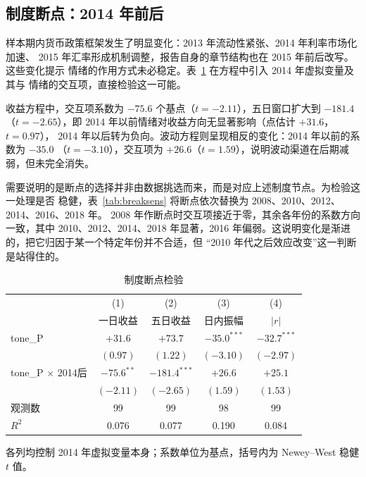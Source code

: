 \subsection{制度断点：2014 年前后}

样本期内货币政策框架发生了明显变化：2013 年流动性紧张、2014 年利率市场化加速、
2015 年汇率形成机制调整，报告自身的章节结构也在 2015 年前后改写。这些变化提示
情绪的作用方式未必稳定。表~\ref{tab:break} 在方程中引入 2014 年虚拟变量及其与
情绪的交互项，直接检验这一可能。

收益方程中，交互项系数为 $-75.6$ 个基点（$t=-2.11$），五日窗口扩大到 $-181.4$
（$t=-2.65$），即 2014 年以前情绪对收益方向无显著影响（点估计 $+31.6$，$t=0.97$），
2014 年以后转为负向。波动方程则呈现相反的变化：2014 年以前的系数为 $-35.0$
（$t=-3.10$），交互项为 $+26.6$（$t=1.59$），说明波动渠道在后期减弱，但未完全消失。

需要说明的是断点的选择并非由数据挑选而来，而是对应上述制度节点。为检验这一处理是否
稳健，表~\ref{tab:breaksens} 将断点依次替换为 2008、2010、2012、2014、2016、2018 年。
2008 年作断点时交互项接近于零，其余各年份的系数方向一致，其中 2010、2012、2014、2018
年显著，2016 年偏弱。这说明变化是渐进的，把它归因于某一个特定年份并不合适，但
``2010 年代之后效应改变''这一判断是站得住的。

\begin{table}[htbp]
\centering
\small
\begin{threeparttable}
\caption{制度断点检验}
\label{tab:break}
\begin{tabular}{lcccc}
\toprule
 & (1) & (2) & (3) & (4) \\
 & 一日收益 & 五日收益 & 日内振幅 & $|r|$ \\
\midrule
tone\_P              & $+31.6$   & $+73.7$   & $-35.0^{***}$ & $-32.7^{***}$ \\
                      & $(0.97)$  & $(1.22)$  & $(-3.10)$     & $(-2.97)$ \\
tone\_P $\times$ 2014后 & $-75.6^{**}$ & $-181.4^{***}$ & $+26.6$ & $+25.1$ \\
                      & $(-2.11)$ & $(-2.65)$ & $(1.59)$      & $(1.53)$ \\
\midrule
观测数                & 99 & 99 & 98 & 99 \\
$R^2$                 & 0.076 & 0.077 & 0.190 & 0.084 \\
\bottomrule
\end{tabular}
\begin{tablenotes}[flushleft]
\footnotesize
\item 各列均控制 2014 年虚拟变量本身；系数单位为基点，括号内为 Newey--West 稳健 $t$ 值。
\end{tablenotes}
\end{threeparttable}
\end{table}

